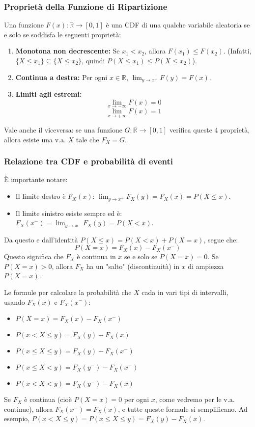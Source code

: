 \subsubsection{Proprietà della Funzione di Ripartizione}
Una funzione $F(x): \mathbb{R} \to [0,1]$ è una CDF di una qualche variabile aleatoria se e solo se soddisfa le seguenti proprietà:
\begin{enumerate}
    \item \textbf{Monotona non decrescente:} Se $x_1 < x_2$, allora $F(x_1) \le F(x_2)$.
    (Infatti, $\{X \le x_1\} \subseteq \{X \le x_2\}$, quindi $P(X \le x_1) \le P(X \le x_2)$).
    \item \textbf{Continua a destra:} Per ogni $x \in \mathbb{R}$, $\lim_{y \to x^+} F(y) = F(x)$.
    \item \textbf{Limiti agli estremi:}
    \[ \lim_{x \to -\infty} F(x) = 0 \]
    \[ \lim_{x \to +\infty} F(x) = 1 \]
\end{enumerate}
Vale anche il viceversa: se una funzione $G: \mathbb{R} \to [0,1]$ verifica queste 4 proprietà, allora esiste una v.a. $X$ tale che $F_X = G$.

\subsubsection{Relazione tra CDF e probabilità di eventi}
È importante notare:
\begin{itemize}
    \item Il limite destro è $F_X(x)$: $\lim_{y \to x^+} F_X(y) = F_X(x) = P(X \le x)$.
    \item Il limite sinistro esiste sempre ed è: $F_X(x^-) = \lim_{y \to x^-} F_X(y) = P(X < x)$.
\end{itemize}
Da questo e dall'identità $P(X \le x) = P(X < x) + P(X = x)$, segue che:
\[ P(X = x) = F_X(x) - F_X(x^-) \]
Questo significa che $F_X$ è continua in $x$ se e solo se $P(X=x)=0$. Se $P(X=x)>0$, allora $F_X$ ha un "salto" (discontinuità) in $x$ di ampiezza $P(X=x)$.

Le formule per calcolare la probabilità che $X$ cada in vari tipi di intervalli, usando $F_X(x)$ e $F_X(x^-)$:
\begin{itemize}
    \item $P(X = x) = F_X(x) - F_X(x^-)$
    \item $P(x < X \le y) = F_X(y) - F_X(x)$
    \item $P(x \le X \le y) = F_X(y) - F_X(x^-)$
    \item $P(x \le X < y) = F_X(y^-) - F_X(x^-)$
    \item $P(x < X < y) = F_X(y^-) - F_X(x)$
\end{itemize}
Se $F_X$ è continua (cioè $P(X=x)=0$ per ogni $x$, come vedremo per le v.a. continue), allora $F_X(x^-) = F_X(x)$, e tutte queste formule si semplificano. Ad esempio, $P(x < X \le y) = P(x \le X \le y) = F_X(y) - F_X(x)$.

